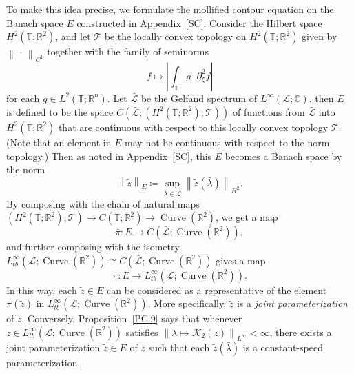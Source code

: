 \documentclass[reqno,centertags,12pt]{amsart}
\theoremstyle{definition}
\numberwithin{equation}{section}
\newcommand{\abs}[1]{\left\lvert#1\right\rvert}
\newcommand{\norm}[1]{\left\|#1\right\|}
\newcommand{\bbR}{{\mathbb{R}}}
\newcommand{\bbC}{{\mathbb{C}}}
\newcommand{\bbT}{{\mathbb{T}}}
\begin{document}
To make this idea precise, we formulate the mollified contour equation on
the Banach space $E$ constructed in Appendix~\ref{SC}.
Consider the Hilbert space $H^{2}(\bbT;\bbR^{2})$,
and let $\mathscr{T}$ be the locally convex topology on $H^{2}(\bbT;\bbR^{2})$ given by
$\norm{\,\cdot\,}_{C^{1}}$ together with the family of seminorms
\[
    f\mapsto \abs{\int_{\bbT}g\cdot \partial_{\xi}^{2}f}
\]
for each $g\in L^{2}(\bbT;\bbR^{n})$.
Let $\bar{\mathcal{L}}$ be the Gelfand spectrum of $L^{\infty}(\mathcal{L};\bbC)$, then
$E$ is defined to be the space
$C\left(\bar{\mathcal{L}};(H^{2}(\bbT;\bbR^{2}),\mathscr{T})\right)$
of functions from $\bar{\mathcal{L}}$ into $H^{2}(\bbT;\bbR^{2})$ that are continuous
with respect to this locally convex topology $\mathscr{T}$.
(Note that an element in $E$ may not be continuous with respect to the norm topology.)
Then as noted in Appendix~\ref{SC}, this $E$
becomes a Banach space by the norm
\[
    \norm{\tilde{z}}_{E} \coloneqq \sup_{\bar{\lambda}\in\bar{\mathcal{L}}}
    \norm{\tilde{z}(\bar{\lambda})}_{H^{2}}.
\]
By composing with the chain of natural maps
$(H^{2}(\bbT;\bbR^{2}),\mathscr{T})\to C(\bbT;\bbR^{2})\to \operatorname{Curve}(\bbR^{2})$,
we get a map
\[
    \bar{\pi}\colon E\to C(\bar{\mathcal{L}};\operatorname{Curve}(\bbR^{2})),
\]
and further composing with the isometry
$L_{tb}^{\infty}(\mathcal{L};\operatorname{Curve}(\bbR^{2}))
\cong C(\bar{\mathcal{L}};\operatorname{Curve}(\bbR^{2}))$ gives a map
\[
    \pi\colon E\to L_{tb}^{\infty}(\mathcal{L};\operatorname{Curve}(\bbR^{2})).
\]
In this way, each $\tilde{z}\in E$ can be considered as a representative of
the element $\pi(\tilde{z})$ in $L_{tb}^{\infty}(\mathcal{L};\operatorname{Curve}(\bbR^{2}))$.
More specifically, $\tilde{z}$ is a \emph{joint parameterization} of $z$.
Conversely, Proposition~\ref{PC.9} says that whenever
$z\in L_{tb}^{\infty}(\mathcal{L};\operatorname{Curve}(\bbR^{2}))$ satisfies
$\norm{\lambda\mapsto\mathcal{K}_{2}(z)}_{L^{\infty}}<\infty$,
there exists a joint parameterization $\tilde{z}\in E$ of $z$ such that
each $\tilde{z}(\bar{\lambda})$ is a constant-speed parameterization.
\end{document}
